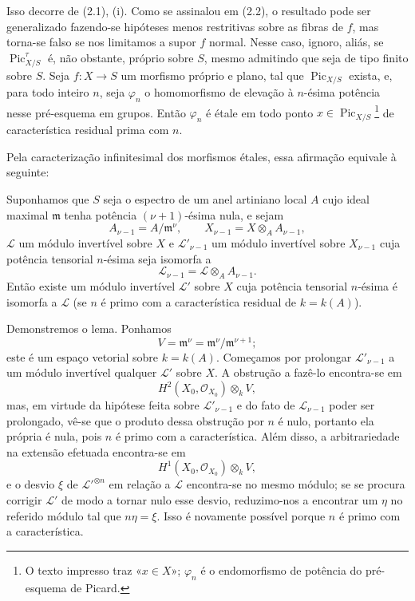 Isso decorre de (2.1), (i). Como se assinalou em (2.2), o resultado pode ser
generalizado fazendo-se hipóteses menos restritivas sobre as fibras de $f$, mas
torna-se falso se nos limitamos a supor $f$ normal. Nesse caso, ignoro, aliás,
se $\operatorname{Pic}_{X/S}^\tau$ é, não obstante, próprio sobre $S$, mesmo
admitindo que seja de tipo finito sobre $S$.
 Seja $f:X\longrightarrow S$ um morfismo próprio e plano,
tal que $\operatorname{Pic}_{X/S}$ exista, e, para todo inteiro $n$, seja
$\varphi_n$ o homomorfismo de elevação à $n$-ésima potência nesse pré-esquema
em grupos. Então $\varphi_n$ é étale em todo ponto
$x\in\operatorname{Pic}_{X/S}$\footnote{O texto impresso traz «$x\in X$»;
$\varphi_n$ é o endomorfismo de potência do pré-esquema de Picard.} de
característica residual prima com $n$.

Pela caracterização infinitesimal dos morfismos étales, essa afirmação equivale
à seguinte:

 Suponhamos que $S$ seja o espectro de um anel artiniano local
$A$ cujo ideal maximal $\mathfrak m$ tenha potência $(\nu+1)$-ésima nula, e
sejam
\[
A_{\nu-1}=A/\mathfrak m^\nu,
\qquad X_{\nu-1}=X\otimes_A A_{\nu-1},
\]
$\mathcal L$ um módulo invertível sobre $X$ e $\mathcal L'_{\nu-1}$ um módulo
invertível sobre $X_{\nu-1}$ cuja potência tensorial $n$-ésima seja isomorfa a
\[
\mathcal L_{\nu-1}=\mathcal L\otimes_A A_{\nu-1}.
\]
Então existe um módulo invertível $\mathcal L'$ sobre $X$ cuja potência
tensorial $n$-ésima é isomorfa a $\mathcal L$ (se $n$ é primo com a
característica residual de $k=k(A)$).

Demonstremos o lema. Ponhamos
\[
V=\mathfrak m^\nu=\mathfrak m^\nu/\mathfrak m^{\nu+1} ;
\]
este é um espaço vetorial sobre $k=k(A)$. Começamos por prolongar
$\mathcal L'_{\nu-1}$ a um módulo invertível qualquer $\mathcal L'$ sobre $X$.
A obstrução a fazê-lo encontra-se em
\[
H^2(X_0,\mathcal O_{X_0})\otimes_k V,
\]
mas, em virtude da hipótese feita sobre $\mathcal L'_{\nu-1}$ e do fato de
$\mathcal L_{\nu-1}$ poder ser prolongado, vê-se que o produto dessa obstrução
por $n$ é nulo, portanto ela própria é nula, pois $n$ é primo com a
característica. Além disso, a arbitrariedade na extensão efetuada encontra-se
em
\[
H^1(X_0,\mathcal O_{X_0})\otimes_k V,
\]
e o desvio $\xi$ de $\mathcal L'^{\otimes n}$ em relação a $\mathcal L$
encontra-se no mesmo módulo; se se procura corrigir $\mathcal L'$ de modo a
tornar nulo esse desvio, reduzimo-nos a encontrar um $\eta$ no referido módulo
tal que $n\eta=\xi$. Isso é novamente possível porque $n$ é primo com a
característica.


